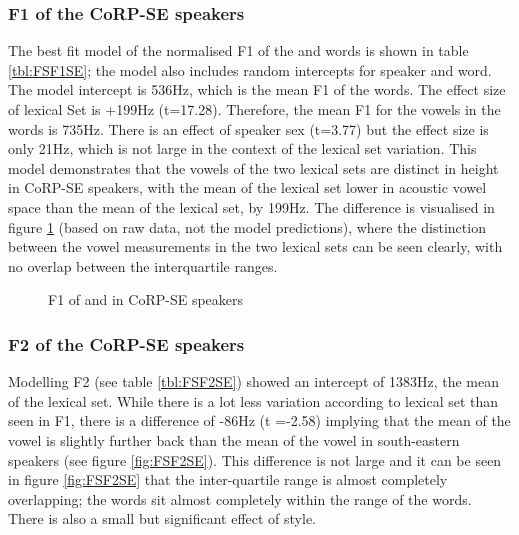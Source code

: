 \documentclass[../../../00.FullDoc/tex/ThesisSkeleton-draft2]{subfiles}
\begin{document}
\subsubsection{F1 of the CoRP-SE speakers} \label{subsubsec:SEF1}
The best fit model of the normalised F1 of the \foot{}  and \strutt{}  words is shown in table \ref{tbl:FSF1SE}; the model also includes random intercepts for speaker and word. The model intercept is 536Hz, which is the mean F1 of the \foot{} words. The effect size of lexical Set is +199Hz (t=17.28). Therefore, the mean F1 for the vowels in the \strutt{} words is 735Hz. There is an effect of speaker sex (t=3.77) but the effect size is only 21Hz, which is not large in the context of the lexical set variation. This model demonstrates that the vowels of the two lexical sets are distinct in height in CoRP-SE speakers, with the mean of the \strutt{} lexical set lower in acoustic vowel space than the mean of the \foot{} lexical set, by 199Hz. The difference is visualised in figure \ref{fig:FSF1SE} (based on raw data, not the model predictions), where the distinction between the vowel measurements in the two lexical sets can be seen clearly, with no overlap between the interquartile ranges.



\begin{figure}[h]
	\centering
	
	\caption{F1 of \foot{} and \strutt{} in CoRP-SE speakers} \label{fig:FSF1SE}
\end{figure}

\subsubsection{F2 of the CoRP-SE speakers} \label{subsubsec:SEF2}
Modelling F2 (see table \ref{tbl:FSF2SE}) showed an intercept of 1383Hz, the mean of the \foot{} lexical set. While there is a lot less variation according to lexical set than seen in F1, there is a difference of -86Hz (t =-2.58) implying that the mean of the \strutt{} vowel is slightly further back than the mean of the \foot{} vowel in south-eastern speakers (see figure \ref{fig:FSF2SE}). This difference is not large and it can be seen in figure \ref{fig:FSF2SE} that the inter-quartile range is almost completely overlapping; the \strutt{} words sit almost completely within the range of the \foot{} words.
There is also a small but significant effect of style.


\end{document}
